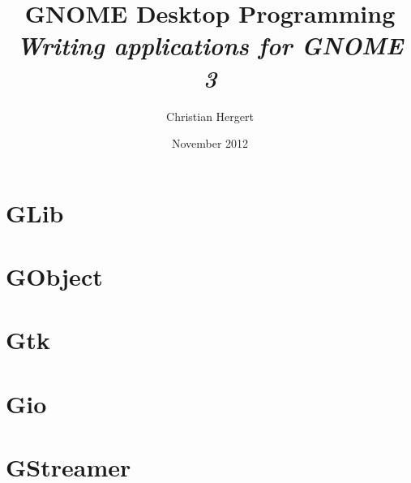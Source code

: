 

\title{
    GNOME Desktop Programming \\
    \textit{Writing applications for GNOME 3}
}
\author{Christian Hergert}
\date{November 2012}

\frontmatter
\maketitle
\tableofcontents


\mainmatter
\part{GLib}





\part{GObject}
\part{Gtk}
\part{Gio}
\part{GStreamer}
\appendix

